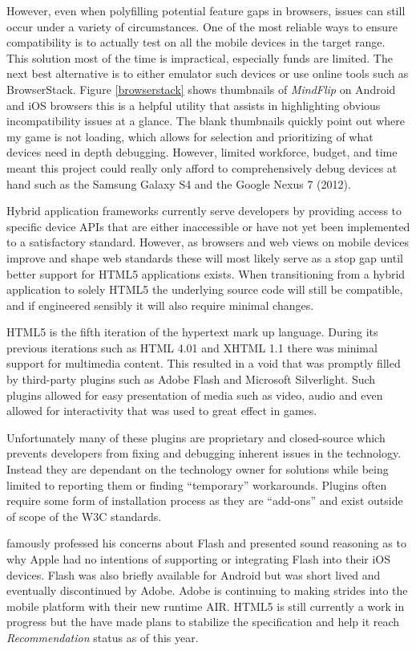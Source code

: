 \documentclass[final]{cmpreport}
\begin{document}
However, even when polyfilling potential feature gaps in browsers, issues can still occur under a variety of circumstances. One of the most reliable ways to ensure compatibility is to actually test on all the mobile devices in the target range. This solution most of the time is impractical, especially funds are limited. The next best alternative is to either emulator such devices or use online tools such as BrowserStack\footnotemark. Figure \ref{browserstack} shows thumbnails of \textit{MindFlip} on Android and iOS browsers this is a helpful utility that assists in highlighting obvious incompatibility issues at a glance. The blank thumbnails quickly point out where my game is not loading, which allows for selection and prioritizing of what devices need in depth debugging. However, limited workforce, budget, and time meant this project could really only afford to comprehensively debug devices at hand such as the Samsung Galaxy S4 and the Google Nexus 7 (2012).

Hybrid application frameworks currently serve developers by providing access to specific device APIs that are either inaccessible or have not yet been implemented to a satisfactory standard. However, as browsers and web views on mobile devices improve and shape web standards these will most likely serve as a stop gap until better support for HTML5 applications exists. When transitioning from a hybrid application to solely HTML5 the underlying source code will still be compatible, and if engineered sensibly it will also require minimal changes.

HTML5 is the fifth iteration of the hypertext mark up language. During its previous iterations such as HTML 4.01 and XHTML 1.1 there was minimal support for multimedia content. This resulted in a void that was promptly filled by third-party plugins such as Adobe Flash and Microsoft Silverlight. Such plugins allowed for easy presentation of media such as video, audio and even allowed for interactivity that was used to great effect in games.

Unfortunately many of these plugins are proprietary and closed-source which prevents developers from fixing and debugging inherent issues in the technology. Instead they are dependant on the technology owner for solutions while being limited to reporting them or finding ``temporary'' workarounds. Plugins often require some form of installation process as they are ``add-ons'' and exist outside of scope of the W3C standards.

\citet{Jobs} famously professed his concerns about Flash and presented sound reasoning as to why Apple had no intentions of supporting or integrating Flash into their iOS devices. Flash was also briefly available for Android but was short lived and eventually discontinued by Adobe. Adobe is continuing to making strides into the mobile platform with their new runtime AIR\footnotemark. HTML5 is still currently a work in progress but the \cite{W3C1} have made plans to stabilize the specification and help it reach \textit{Recommendation\footnotemark} status as of this year.
\end{document}
